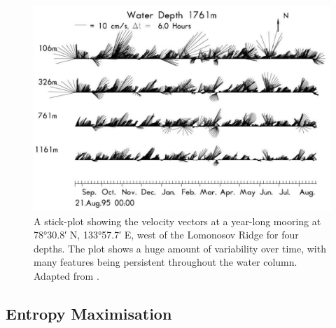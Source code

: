 \documentclass[12pt,a4paper]{report}
\begin{document}
\begin{figure}
	\centering
	\includegraphics[width=\linewidth]{Woodgate2001Mooring}
	\caption[Adapted from \cite{woodgate2001arctic}]{A  stick-plot showing the velocity vectors at 
		a year-long mooring at \ang{78;30.8;} N, \ang{133;57.7;} E, west of the Lomonosov Ridge for four depths.  The plot shows a huge amount of variability over time, with many
		features being persistent throughout the water column. Adapted from \cite{woodgate2001arctic}.}
	\label{fig:Woodgate2001Mooring}
\end{figure}

  
                      \subsection{Entropy  Maximisation}
                      \label{entropy}
                     
\end{document}
